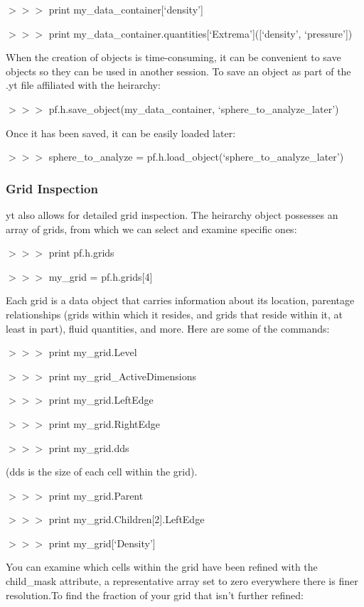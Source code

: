 {\scriptsize$>>>$} print my\_data\_container[`density']

{\scriptsize$>>>$} print my\_data\_container.quantities[`Extrema']([`density', `pressure'])

When the creation of objects is time-consuming, it can be convenient
to save objects so they can be used in another session. To save an
object as part of the .yt file affiliated with the heirarchy:

{\scriptsize$>>>$} pf.h.save\_object(my\_data\_container, `sphere\_to\_analyze\_later')

Once it has been saved, it can be easily loaded later:

{\scriptsize$>>>$} sphere\_to\_analyze = pf.h.load\_object(`sphere\_to\_analyze\_later')

\subsubsection{Grid Inspection}

yt also allows for detailed grid inspection. The heirarchy object
possesses an array of grids, from which we can select and examine
specific ones:

{\scriptsize$>>>$} print pf.h.grids

{\scriptsize$>>>$} my\_grid = pf.h.grids[4]

Each grid is a data object that carries information about its
location, parentage relationships (grids within which it resides, and
grids that reside within it, at least in part), fluid quantities, and
more. Here are some of the commands:

{\scriptsize$>>>$} print my\_grid.Level

{\scriptsize$>>>$} print my\_grid\_ActiveDimensions

{\scriptsize$>>>$} print my\_grid.LeftEdge

{\scriptsize$>>>$} print my\_grid.RightEdge

{\scriptsize$>>>$} print my\_grid.dds

(dds is the size of each cell within the grid).

{\scriptsize$>>>$} print my\_grid.Parent

{\scriptsize$>>>$} print my\_grid.Children[2].LeftEdge

{\scriptsize$>>>$} print my\_grid[`Density']

You can examine which cells within the grid have been refined with the
child\_mask attribute, a representative array set to zero everywhere
there is finer resolution.To find the fraction of your grid that isn't
further refined:

